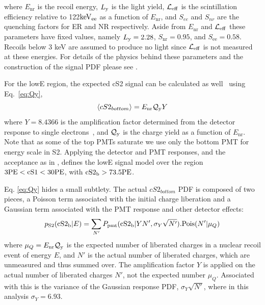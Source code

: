 %
%
%

where $E_\mathrm{nr}$ is the recoil energy, $L_{\mathrm{y}}$ is the light yield, $\mathcal{L}_{\mathrm{eff}}$ is the scintillation efficiency relative to 122$\mathrm{keV_{ee}}$ as a function of $E_\mathrm{nr}$, and $S_{ee}$ and $S_{nr}$ are the quenching factors for ER and NR respectively. Aside from $E_\mathrm{nr}$ and $\mathcal{L}_{\mathrm{eff}}$ these parameters have fixed values, namely $L_{\mathrm{y}} = 2.28$, $S_\mathrm{nr} = 0.95$, and $S_\mathrm{ee} = 0.58$. Recoils below 3 keV are assumed to produce no light since $\mathcal{L}_{\mathrm{eff}}$ is not measured at these energies. For details of the physics behind these parameters and the construction of the signal PDF please see \cite{xe100_ana2012,xe100_run_combination}. 

For the lowE region, the expected cS2 signal can be calculated as well~\cite{DataMCXenon} using Eq.~\ref{eq:Qy},
%
\begin{equation}
\label{eq:Qy}
	\langle cS2_{bottom} \rangle = E_{\mathrm{nr}}\mathcal{Q}_{\mathrm{y}} Y   
\end{equation}
%
where $Y = 8.4366$ is the amplification factor determined from the detector response to single electrons~\cite{XenonSingleElectron}, and $\mathcal{Q}_{\mathrm{y}}$ is the charge yield as a function of $E_\mathrm{nr}$. Note that as some of the top PMTs saturate we use only the bottom PMT for energy scale in S2. Applying the detector and PMT responses, and the acceptance as in \cite{xe100_run_combination}, defines the lowE signal model over the region $3 \mathrm{PE} < \mathrm{cS1} < 30 \mathrm{PE}$, with $\mathrm{cS2}_\mathrm{b} > 73.5 \mathrm{PE}$.

Eq. \ref{eq:Qy} hides a small subtlety. The actual $cS2_{bottom}$ PDF is composed of two pieces, a Poisson term associated with the initial charge liberation and a Gaussian term associated with the PMT response and other detector effects:
%
\begin{equation}
\label{eq.cS2pdf}
p_\mathrm{S2}(\mathrm{\mathrm{cS2}_\mathrm{b}}|E) = \sum_{N'} P_\mathrm{pmt}(\mathrm{\mathrm{cS2}_\mathrm{b}}|Y N',\sigma_Y \sqrt{N'}).\mathrm{Pois}(N'|\mu_Q)
\end{equation}
%
where $\mu_Q=E_{\mathrm{nr}}\mathcal{Q}_{\mathrm{y}}$ is the expected number of liberated charges in a nuclear recoil event of energy $E$, and $N'$ is the actual number of liberated charges, which are unmeasured and thus summed over. The amplification factor $Y$ is applied on the actual number of liberated charges $N'$, not the expected number $\mu_Q$. Associated with this is the variance of the Gaussian response PDF, $\sigma_Y\sqrt{N'}$, where in this analysis $\sigma_Y = 6.93$. 


